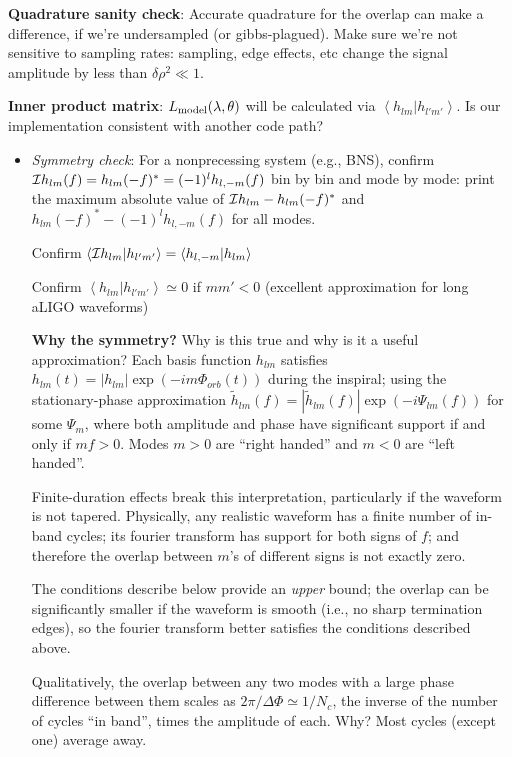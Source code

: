 \documentclass[twocolumn,prd,nofootinbib]{revtex4}
\newcommand\ForRichardOnly[1]{}
\newcommand\qmstateproduct[2]{\left\langle#1|#2\right\rangle}
\begin{document}
\begin{widetext}
\begin{widetext}
\noindent \textbf{Quadrature sanity check}: Accurate quadrature for the overlap can make a difference, if we're
undersampled (or gibbs-plagued). Make sure we're not sensitive to sampling rates: sampling, edge effects, etc change the
signal amplitude by less than $\delta \rho^2 \ll 1$.

\noindent \textbf{Inner product matrix}: $L_{\rm model}(\lambda,\theta)$ will be calculated via
$\qmstateproduct{h_{lm}}{h_{l'm'}}$.  Is our implementation consistent with another code path?
\begin{itemize}
\item \emph{Symmetry check}:  For a nonprecessing system (e.g., BNS), confirm ${\cal I}h_{lm}(f) =
  h_{lm}(-f)^*=(-1)^lh_{l,-m}(f)$ bin by bin and mode by mode: print the maximum absolute value of ${\cal I}h_{lm}  -
  h_{lm}(-f)^*$ and $h_{lm}(-f)^* -(-1)^l h_{l,-m}(f)$ for all modes.

Confirm  $\qmstateproduct{{\cal I} h_{lm}}{h_{l'm'}} = \qmstateproduct{h_{l,-m}}{h_{lm}}$

Confirm $\qmstateproduct{h_{lm}}{h_{l'm'}}\simeq 0$ if $m m' <0$  (excellent approximation for long aLIGO
waveforms)%
\begin{shaded}
\noindent \textbf{Why the symmetry?} Why is this true and why is it a useful approximation? Each basis function $h_{lm}$ satisfies $h_{lm}(t)=
|h_{lm}|\exp(-i m\Phi_{orb}(t))$ during the inspiral; using the stationary-phase approximation $\tilde{h}_{lm}(f) =
|\tilde{h}_{lm}(f)|\exp(-i \Psi_{lm}(f) )$ for some $\Psi_m$, where both amplitude and phase have significant support if
and only if $m f>0$.  Modes $m>0$ are ``right handed'' and $m<0$ are ``left handed''.  

Finite-duration effects break this interpretation, particularly if the waveform is not tapered.  Physically,  any realistic waveform has a finite number of in-band cycles; its
fourier transform has support for both signs of $f$; and therefore the overlap between $m$'s of different signs is not
exactly zero.  

The  conditions describe below provide an \emph{upper} bound; the overlap can be significantly smaller if the waveform is smooth (i.e., no
sharp termination edges), so the fourier transform better satisfies the conditions described above.

Qualitatively,  the overlap between any two modes with a large phase difference between them scales as $2\pi/\Delta \Phi
\simeq 1/N_c$, the inverse of the number of cycles ``in band'', times the amplitude of each.  Why? Most cycles (except one) average
away.   
\ForRichardOnly{
Approximating the overlap in the neighborhood of the local maximum, we find
\begin{eqnarray}
\qmstateproduct{h_{lm}}{h_{l'm'}} = 2\int df e^{-i\Delta\Psi(f)} \frac{|\tilde{h}_{lm}(f)\tilde{h}_{l'm'}(f)|}{S_h} \simeq
\frac{|\tilde{h}_{lm}(f_*)\tilde{h}_{l'm'}(f_*)|e^{i\Delta\Psi}}{S_h}\frac{1}{\sqrt{i \pi \frac{d^2\Delta \Psi}{df^2}}}
\end{eqnarray}
}


\end{shaded}
\end{itemize}
\end{widetext}
\end{widetext}
\end{document}
